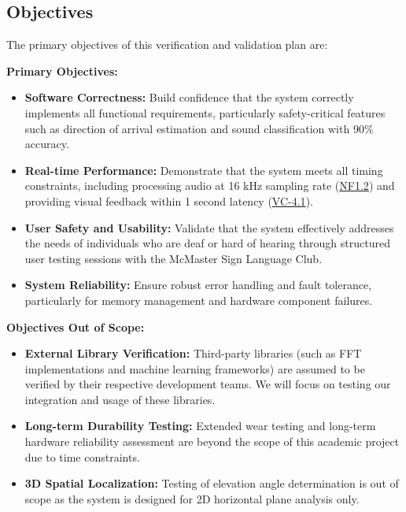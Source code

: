 \documentclass[12pt, titlepage]{article}
\begin{document}
\subsection{Objectives}

The primary objectives of this verification and validation plan are:

\textbf{Primary Objectives:}
\begin{itemize}
    \item \textbf{Software Correctness:} Build confidence that the system
    correctly implements all functional requirements, particularly
    safety-critical features such as direction of arrival estimation and sound
    classification with 90\% accuracy.
    
    \item \textbf{Real-time Performance:} Demonstrate that the system meets all
    timing constraints, including processing audio at 16 kHz sampling rate
    (\hyperref[SRS-NFR1_2]{NF1.2}) and providing visual feedback within 1 second
    latency (\hyperref[SRS-sec:VC-4.1]{VC-4.1}).
    
    \item \textbf{User Safety and Usability:} Validate that the system
    effectively addresses the needs of individuals who are deaf or hard of
    hearing through structured user testing sessions with the McMaster Sign
    Language Club.
    
    \item \textbf{System Reliability:} Ensure robust error handling and fault
    tolerance, particularly for memory management and hardware component
    failures.
\end{itemize}

\textbf{Objectives Out of Scope:}
\begin{itemize}
    \item \textbf{External Library Verification:} Third-party libraries (such as
    FFT implementations and machine learning frameworks) are assumed to be
    verified by their respective development teams. We will focus on testing our
    integration and usage of these libraries.
    
    \item \textbf{Long-term Durability Testing:} Extended wear testing and
    long-term hardware reliability assessment are beyond the scope of this
    academic project due to time constraints.
        
    \item \textbf{3D Spatial Localization:} Testing of elevation angle
    determination is out of scope as the system is designed for 2D horizontal
    plane analysis only.
\end{itemize}
\end{document}
